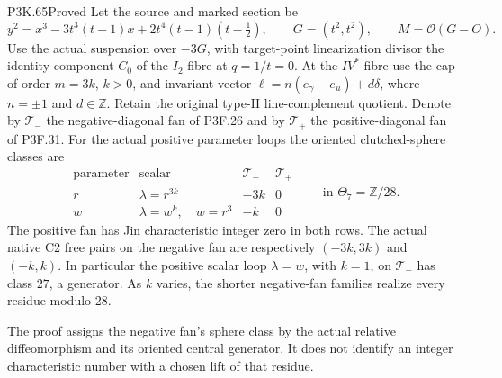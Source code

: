 \begin{statement}{P3K.65}{Proved}
Let the source and marked section be
\[
 y^2=x^3-3t^3(t-1)x+2t^4(t-1)(t-\tfrac12),\qquad
 G=(t^2,t^2),\qquad M=\mathcal O(G-O).
\]
Use the actual suspension over \(-3G\), with target-point
linearization divisor the identity component \(C_0\) of the
\(I_2\) fibre at \(q=1/t=0\). At the \(IV^*\) fibre use the
cap of order \(m=3k\), \(k>0\), and invariant vector
\(\ell=n(e_\gamma-e_u)+d\delta\), where \(n=\pm1\) and
\(d\in\mathbb Z\). Retain the original type-II line-complement
quotient. Denote by \(\mathcal T_-\) the negative-diagonal fan
of P3F.26 and by \(\mathcal T_+\) the positive-diagonal fan of
P3F.31. For the actual positive parameter loops the oriented
clutched-sphere classes are
\[
\begin{array}{c|c|c|c}
 \text{parameter}&\text{scalar}&\mathcal T_-&\mathcal T_+\\ \hline
 r&\lambda=r^{3k}&-3k&0\\
 w&\lambda=w^k,\quad w=r^3&-k&0
\end{array}\qquad\text{in }\Theta_7=\mathbb Z/28.       \tag{P3K.65.OR.1}
\]
The positive fan has Jin characteristic integer zero in both rows.
The actual native C2 free pairs on the negative fan are respectively
\((-3k,3k)\) and \((-k,k)\). In particular the positive scalar
loop \(\lambda=w\), with \(k=1\), on \(\mathcal T_-\) has class
\(27\), a generator. As \(k\) varies, the shorter negative-fan
families realize every residue modulo 28.

The proof assigns the negative fan's sphere class by the actual
relative diffeomorphism and its oriented central generator. It does
not identify an integer characteristic number with a chosen lift of
that residue.
\end{statement}
